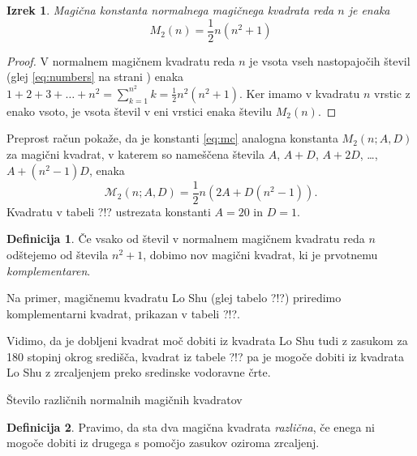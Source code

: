 \documentclass[a4paper,12pt]{article}
\theoremstyle{definition}
\newtheorem{definicija}{Definicija}
\theoremstyle{plain}
\newtheorem{izrek}{Izrek}
\begin{document}
\begin{izrek}
   Magična konstanta normalnega magičnega kvadrata reda \(n\)
   je enaka
   \begin{equation}
      \label{eq:mc}
      M_2(n) = \frac{1}{2} n(n^2+1)
   \end{equation}
\end{izrek}

\begin{proof}
   V normalnem magičnem kvadratu reda $n$ je vsota vseh nastopajočih
   števil (glej \eqref{eq:numbers} na strani \pageref{eq:numbers}) enaka
   $1+2+3+\dots+n^2=\sum_{k=1}^{n^2}k=\frac{1}{2}n^2(n^2+1)$. Ker imamo
   v kvadratu $n$ vrstic z enako vsoto, je vsota števil v eni vrstici
   enaka številu $M_2(n)$. %
\end{proof}

Preprost račun pokaže, da je konstanti \eqref{eq:mc} analogna konstanta
$M_2(n;A,D)$ za magični kvadrat, v katerem so nameščena števila
$A$, $A+D$, $A+2D$, \dots, $A+(n^2-1)D$, enaka %
\[
   \mathcal{M}_{2}(n;A,D) = \frac{1}{2} n \left(2A+D(n^2-1) \right).
\]
Kvadratu v tabeli ?!? ustrezata konstanti $A=20$ in $D=1$.

 \begin{definicija}
      Če vsako od števil v normalnem magičnem kvadratu reda $n$ odštejemo
      od števila $n^2+1$, dobimo nov magični kvadrat, ki je prvotnemu
      \emph{komplementaren}.
\end{definicija}

Na primer, magičnemu kvadratu Lo Shu (glej tabelo ?!?) priredimo
komplementarni kvadrat, prikazan v tabeli ?!?.
%

Vidimo, da je dobljeni kvadrat moč dobiti iz kvadrata Lo Shu tudi z zasukom za
180 stopinj okrog središča, kvadrat iz tabele ?!? pa je mogoče dobiti
iz kvadrata Lo Shu z zrcaljenjem preko sredinske vodoravne črte.

Število različnih normalnih magičnih kvadratov

 \begin{definicija}
      Pravimo, da sta dva magična kvadrata \emph{različna}, če enega ni mogoče dobiti
      iz drugega s pomočjo zasukov oziroma zrcaljenj.
\end{definicija}
\end{document}
